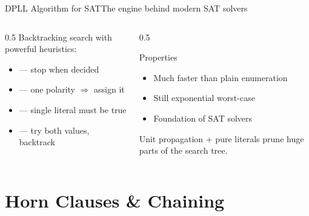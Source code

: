 \documentclass[aspectratio=169,11pt]{beamer}
\begin{document}
\begin{frame}{DPLL Algorithm for SAT}{The engine behind modern SAT solvers}
  \begin{columns}[T]
    \begin{column}{0.5\textwidth}
      Backtracking search with powerful heuristics:
      \begin{itemize}\small
        \item {} — stop when decided
        \item {} — one polarity $\Rightarrow$ assign it
        \item {} — single literal must be true
        \item {} — try both values, backtrack
      \end{itemize}
    \end{column}
    \begin{column}{0.5\textwidth}
      \begin{block}{Properties}
        \small
        \begin{itemize}
          \item Much faster than plain enumeration
          \item Still exponential worst-case
          \item Foundation of  SAT solvers
        \end{itemize}
      \end{block}
      \centering\scriptsize
      Unit propagation + pure literals prune huge parts of the search tree.
    \end{column}
  \end{columns}
\end{frame}

\section{Horn Clauses \& Chaining}
\end{document}
